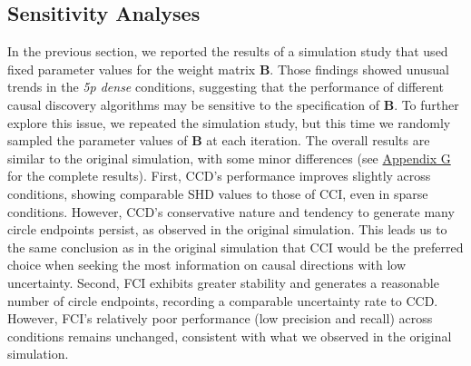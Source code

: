 \documentclass[twoside, 11pt]{article}
\begin{document}
\subsection{Sensitivity Analyses} \label{sensitivity}
In the previous section, we reported the results of a simulation study that used fixed parameter values for the weight matrix $\mathbf{B}$. Those findings showed unusual trends in the \textit{5p dense} conditions, suggesting that the performance of different causal discovery algorithms may be sensitive to the specification of $\mathbf{B}$. 
To further explore this issue, we repeated the simulation study, but this time we randomly sampled the parameter values of $\mathbf{B}$ at each iteration. The overall results are similar to the original simulation, with some minor differences (see \hyperref[varyingbeta]{Appendix G} for the complete results). First, CCD's performance improves slightly across conditions, showing comparable SHD values to those of CCI, even in sparse conditions. However, CCD's conservative nature and tendency to generate many circle endpoints persist, as observed in the original simulation. This leads us to the same conclusion as in the original simulation that CCI would be the preferred choice when seeking the most information on causal directions with low uncertainty. Second, FCI exhibits greater stability and generates a reasonable number of circle endpoints, recording a comparable uncertainty rate to CCD. However, FCI's relatively poor performance (low precision and recall) across conditions remains unchanged, consistent with what we observed in the original simulation.
\end{document}
